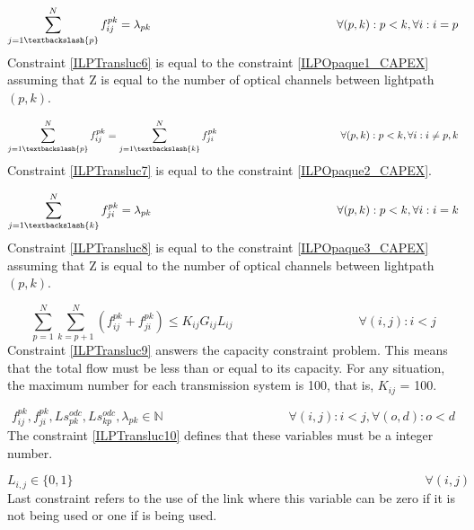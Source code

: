 \begin{equation}
\sum_{j=1\textbackslash \{p\}}^{N} f_{ij}^{pk} = \lambda_{pk}  \qquad \qquad \qquad \qquad \qquad \qquad \qquad \qquad
\forall(p,k) : p < k, \forall i: i = p
\label{ILPTransluc6}
\end{equation}
\noindent
Constraint \ref{ILPTransluc6} is equal to the constraint \ref{ILPOpaque1_CAPEX} assuming that Z is equal to the number of optical channels between lightpath $(p,k)$.

\begin{equation}
\sum_{j=1\textbackslash \{p\}}^{N} f_{ij}^{pk} = \sum_{j=1\textbackslash \{k\}}^{N} f_{ji}^{pk} \qquad \qquad \qquad \qquad \qquad \qquad
\forall(p,k) : p < k, \forall i: i \neq p,k
\label{ILPTransluc7}
\end{equation}
\noindent
Constraint \ref{ILPTransluc7} is equal to the constraint \ref{ILPOpaque2_CAPEX}.

\begin{equation}
\sum_{j=1\textbackslash \{k\}}^{N} f_{ji}^{pk} = \lambda_{pk}  \qquad \qquad \qquad \qquad \qquad \qquad \qquad \qquad
\forall(p,k) : p < k, \forall i: i = k
\label{ILPTransluc8}
\end{equation}
\noindent
Constraint \ref{ILPTransluc8} is equal to the constraint \ref{ILPOpaque3_CAPEX} assuming that Z is equal to the number of optical channels between lightpath $(p,k)$.

\begin{equation}
\sum_{p=1}^{N} \sum_{k=p+1}^{N} \left( f_{ij}^{pk} + f_{ji}^{pk}\right) \leq K_{ij} G_{ij} L_{ij} \qquad \qquad \qquad \qquad \qquad
\forall (i,j) : i < j
\label{ILPTransluc9}
\end{equation}
\noindent
Constraint \ref{ILPTransluc9} answers the capacity constraint problem. This means that the total flow must be less than or equal to its capacity. For any situation, the maximum number for each transmission system is 100, that is, $K_{ij}$ = 100.

\begin{equation}
f_{ij}^{pk} , f_{ji}^{pk} , Ls_{pk}^{odc} , Ls_{kp}^{odc} , \lambda_{pk} \in \mathbb{N}   \qquad \qquad \qquad \qquad \qquad
\forall(i,j) : i < j, \forall(o,d) : o < d
\label{ILPTransluc10}
\end{equation}
\noindent
The constraint \ref{ILPTransluc10} defines that these variables must be a integer number.

\begin{equation}
L_{i,j} \in \{0,1\} \qquad \qquad \qquad \qquad \qquad \qquad \qquad \qquad \qquad \qquad \qquad \qquad \qquad \qquad
\forall(i,j)
\label{ILPTransluc11}
\end{equation}
\noindent
Last constraint refers to the use of the link where this variable can be zero if it is not being used or one if is being used.\\

